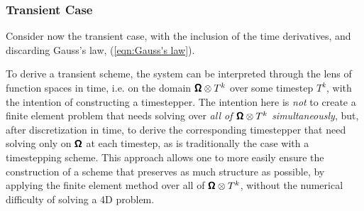 \subsubsection*{Transient Case}

    Consider now the transient case, with the inclusion of the time derivatives, and discarding Gauss's law, (\ref{eqn:Gauss's law}).
    
    To derive a transient scheme, the system can be interpreted through the lens of function spaces in time, i.e. on the domain $\pmb{\mathsf{\Omega}}\otimes T^{k}$ over some timestep $T^{k}$, with the intention of constructing a timestepper. The intention here is \emph{not} to create a finite element problem that needs solving over \emph{all of $\pmb{\mathsf{\Omega}}\otimes T^{k}$ simultaneously}, but, after discretization in time, to derive the corresponding timestepper that need solving only on $\pmb{\mathsf{\Omega}}$ at each timestep, as is traditionally the case with a timestepping scheme. This approach allows one to more easily ensure the construction of a scheme that preserves as much structure as possible, by applying the finite element method over all of $\pmb{\mathsf{\Omega}}\otimes T^{k}$, without the numerical difficulty of solving a 4D problem.

